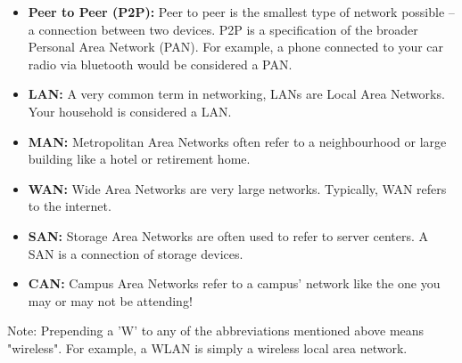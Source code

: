 \documentclass{article}
\begin{document}
\begin{itemize}

\item{%
    \textbf{Peer to Peer (P2P):} Peer to peer is the smallest type of network possible – a connection between
    two devices. P2P is a specification of the broader Personal Area Network (PAN). For example, a phone
    connected to your car radio via bluetooth would be considered a PAN.
}

\item{%
    \textbf{LAN:} A very common term in networking, LANs are Local Area Networks. Your household is considered
    a LAN.
}

\item{%
    \textbf{MAN:} Metropolitan Area Networks often refer to a neighbourhood or large building like a hotel or
    retirement home.
}

\item{%
    \textbf{WAN:} Wide Area Networks are very large networks. Typically, WAN refers to the internet.
}

\item{%
    \textbf{SAN:} Storage Area Networks are often used to refer to server centers. A SAN is a connection of
    storage devices.
}

\item{%
    \textbf{CAN:} Campus Area Networks refer to a campus’ network like the one you may or may not be attending!
}

\end{itemize}

Note: Prepending a 'W' to any of the abbreviations mentioned above means "wireless". For example, a WLAN is
simply a wireless local area network.
\end{document}
